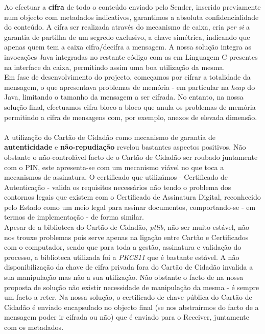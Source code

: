 Ao efectuar a \textbf{cifra} de todo o conteúdo enviado pelo Sender, inserido previamente num objecto com metadados indicativos, garantimos a absoluta confidencialidade do conteúdo. A cifra ser realizada através do mecanismo de caixa, cria \textit{per si} a garantia de partilha de um segredo exclusivo, a chave simétrica, indicando que apenas quem tem a caixa cifra/decifra a mensagem. A nossa solução integra as invocações Java integradas no restante código com as em Linguagem C presentes na interface da caixa, permitindo assim uma boa utilização da mesma.\\
Em fase de desenvolvimento do projecto, começamos por cifrar a totalidade da mensagem, o que apresentava problemas de memória - em particular na \textit{heap} do Java, limitando o tamanho da mensagem a ser cifrada. No entanto, na nossa solução final, efectuamos cifra bloco a bloco que anula os problemas de memória permitindo a cifra de mensagens com, por exemplo, anexos de elevada dimensão. \\
\\
A utilização do Cartão de Cidadão como mecanismo de garantia de \textbf{autenticidade} e \textbf{não-repudiação} revelou bastantes aspectos positivos.
Não obstante o não-controlável facto de o Cartão de Cidadão ser roubado juntamente com o PIN, este apresenta-se com um mecanismo viável no que toca a mecanismos de assinatura.
O certificado que utilizámos - Certificado de Autenticação - valida os requisitos necessários não tendo o problema dos contornos legais que existem com o Certificado de Assinatura Digital, reconhecido pelo Estado como um meio legal para assinar documentos, comportando-se - em termos de implementação - de forma similar.\\
Apesar de a biblioteca do Cartão de Cidadão, \textit{ptlib}, não ser muito estável, não nos trouxe problemas pois serve apenas na ligação entre Cartão e Certificados com o computador, sendo que para toda a gestão, assinatura e validação do processo, a biblioteca utilizada foi a \textit{PKCS11} que é bastante estável.
A não disponibilização da chave de cifra privada fora do Cartão de Cidadão invalida a sua manipulação mas não a sua utilização. Não obstante o facto de na nossa proposta de solução não existir necessidade de manipulação da mesma - é sempre um facto a reter. Na nossa solução, o certificado de chave pública do Cartão de Cidadão é enviado encapsulado no objecto final (se nos abstraírmos do facto de a mensagem poder ir cifrada ou não) que é enviado para o Receiver, juntamente com os metadados.\\
